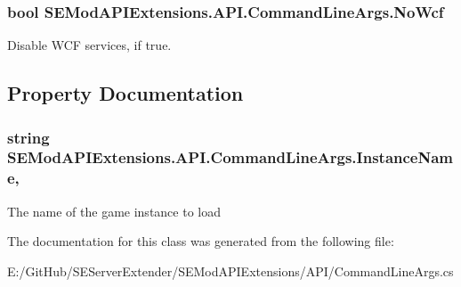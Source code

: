 \subsubsection[{No\+Wcf}]{\setlength{\rightskip}{0pt plus 5cm}bool S\+E\+Mod\+A\+P\+I\+Extensions.\+A\+P\+I.\+Command\+Line\+Args.\+No\+Wcf}\label{class_s_e_mod_a_p_i_extensions_1_1_a_p_i_1_1_command_line_args_ae847e24b21847430cc5ac8d6e5ddff69}


Disable W\+C\+F services, if true.



\subsection{Property Documentation}
\hypertarget{class_s_e_mod_a_p_i_extensions_1_1_a_p_i_1_1_command_line_args_a5e94ca2cc9d1242e1eb1816594c93eff}{}
\subsubsection[{Instance\+Name}]{\setlength{\rightskip}{0pt plus 5cm}string S\+E\+Mod\+A\+P\+I\+Extensions.\+A\+P\+I.\+Command\+Line\+Args.\+Instance\+Name\hspace{0.3cm}{\ttfamily [get]}, {\ttfamily [set]}}\label{class_s_e_mod_a_p_i_extensions_1_1_a_p_i_1_1_command_line_args_a5e94ca2cc9d1242e1eb1816594c93eff}


The name of the game instance to load



The documentation for this class was generated from the following file\+:\begin{DoxyCompactItemize}
\item 
E\+:/\+Git\+Hub/\+S\+E\+Server\+Extender/\+S\+E\+Mod\+A\+P\+I\+Extensions/\+A\+P\+I/Command\+Line\+Args.\+cs\end{DoxyCompactItemize}
